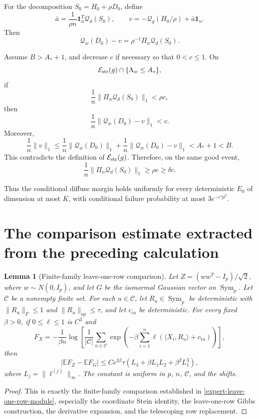 \documentclass[11pt]{article}
\numberwithin{equation}{section}
\newtheorem{lemma}[theorem]{Lemma}
\theoremstyle{definition}
\theoremstyle{remark}
\newcommand{\E}{\mathbb E}
\newcommand{\1}{\boldsymbol 1}
\newcommand{\PiZero}{\Pi_n}
\newcommand{\Sym}{\operatorname{Sym}}
\begin{document}
\begin{aiblock}
For the decomposition $S_0=H_0+\rho D_0$, define
\[
  \bar a
  =
  \frac1{\rho n}\1_n^T\mathcal Q_d(S_0),
  \qquad
  v
  =
  -\mathcal Q_g(H_0/\rho)+\bar a\1_n.
\]
Then
\[
  \mathcal Q_w(D_0)-v
  =
  \rho^{-1}\PiZero\mathcal Q_d(S_0).
\]

Assume $B>A_*+1$, and decrease $c$ if necessary so that
$0<c\le1$. On
\[
  \mathcal E_{\rm str}(g)\cap\{\Lambda_w\le A_*\},
\]
if
\[
  \frac1n\|\PiZero\mathcal Q_d(S_0)\|_1<\rho c,
\]
then
\[
  \frac1n\|\mathcal Q_w(D_0)-v\|_1<c.
\]
Moreover,
\[
  \frac1n\|v\|_1
  \le
  \frac1n\|\mathcal Q_w(D_0)\|_1
  +
  \frac1n\|\mathcal Q_w(D_0)-v\|_1
  <
  A_*+1
  <
  B.
\]
This contradicts the definition of
$\mathcal E_{\rm str}(g)$. Therefore, on the same good
event,
\[
  \frac1n\|\PiZero\mathcal Q_d(S_0)\|_1
  \ge
  \rho c
  \ge
  \delta c.
\]

Thus the conditional diffuse margin holds uniformly for
every deterministic $E_0$ of dimension at most $K$, with
conditional failure probability at most $3e^{-c'p^2}$. 

\end{aiblock}


\section{The comparison estimate extracted from the
  preceding
  calculation}\label{the-comparison-estimate-extracted-from-the-preceding-calculation}

\begin{aiblock}
 
\begin{lemma}[Finite-family leave-one-row
  comparison]\label{lem:cavity-comparison}
  Let $Z=(ww^T-I_p)/\sqrt2$, where $w\sim N(0,I_p)$, and
  let $G$ be the isonormal Gaussian vector on $\Sym_p$.
  Let $\mathcal C$ be a nonempty finite set. For each
  $u\in\mathcal C$, let $R_u\in\Sym_p$ be deterministic with
  $\|R_u\|_F\le1$ and $\|R_u\|_{op}\le\tau$, and let
  $c_{iu}$ be deterministic. 
  For every fixed $\beta>0$, if
  $0\le\ell\le1$ is $C^3$ and
  \[
    F_X=-\frac1{\beta n}\log\left[
    \frac1{|\mathcal C|}\sum_{u\in\mathcal C}
    \exp\left(-\beta\sum_{i=1}^n
    \ell(\langle X_i,R_u\rangle+c_{iu})\right)
    \right],
  \]
  then
  \[
    |\E F_Z-\E F_G| \le Ce^{3\beta}\tau \left(L_3+\beta
    L_1L_2+\beta^2L_1^3\right),
  \]
  where $L_j=\|\ell^{(j)}\|_\infty$. The constant is
  uniform in $p$, $n$, $\mathcal C$, and the shifts.
\end{lemma}

\begin{proof}
  This is exactly the finite-family comparison established in
  \cref{expert-leave-one-row-module}, especially the coordinate
  Stein identity, the leave-one-row Gibbs construction, the
  derivative expansion, and the telescoping row replacement.
\end{proof}

\end{aiblock}
\end{document}
